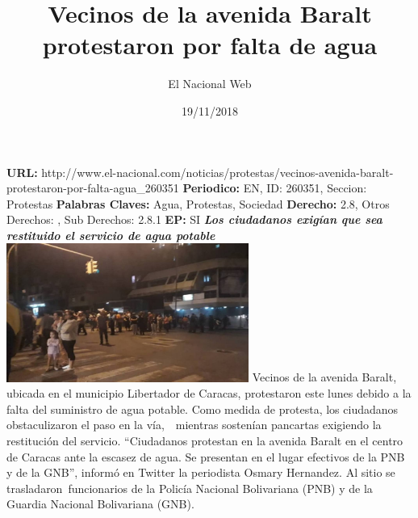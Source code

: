\documentclass{article}%
\title{\textbf{Vecinos de la avenida Baralt protestaron por falta de agua}}%
\author{El Nacional Web}%
\date{19/11/2018}%
\begin{document}
%
\normalsize%
\maketitle%
\textbf{URL: }%
http://www.el{-}nacional.com/noticias/protestas/vecinos{-}avenida{-}baralt{-}protestaron{-}por{-}falta{-}agua\_260351\newline%
%
\textbf{Periodico: }%
EN, %
ID: %
260351, %
Seccion: %
Protestas\newline%
%
\textbf{Palabras Claves: }%
Agua, Protestas, Sociedad\newline%
%
\textbf{Derecho: }%
2.8, %
Otros Derechos: %
, %
Sub Derechos: %
2.8.1\newline%
%
\textbf{EP: }%
SI\newline%
\newline%
%
\textbf{\textit{Los ciudadanos exigían que sea restituido el servicio de agua potable}}%
\newline%
\newline%
%
\includegraphics[width=300px]{35.jpg}%
\newline%
%
Vecinos de la avenida Baralt, ubicada en el municipio Libertador de Caracas, protestaron este lunes debido a la falta del suministro de agua potable.%
\newline%
%
Como medida de protesta, los ciudadanos obstaculizaron el paso en la vía,~~mientras sostenían pancartas exigiendo la restitución del servicio.%
\newline%
%
“Ciudadanos protestan en la avenida Baralt en el centro de Caracas ante la escasez de agua. Se presentan en el lugar efectivos de la PNB y de la GNB”, informó en Twitter la periodista Osmary Hernandez.%
\newline%
%
Al sitio se trasladaron~funcionarios de la Policía Nacional Bolivariana (PNB) y de la Guardia Nacional Bolivariana (GNB).%
\newline%
%
\end{document}

